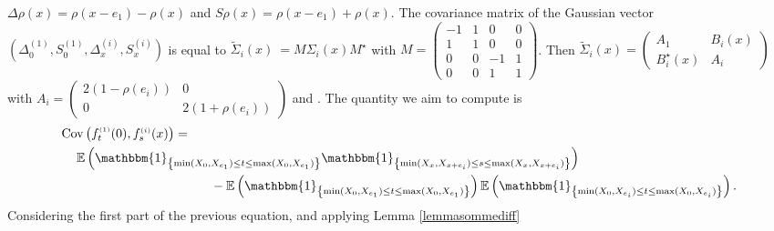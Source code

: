 \documentclass[12pt]{article}
\renewcommand{\tilde}{\widetilde}
\theoremstyle{Theorem}
\begin{document}
$\Delta \rho(x) = \rho(x-e_1)-\rho(x)$ and $S\rho(x)  =  \rho(x-e_1)+\rho(x)$. The covariance matrix of the Gaussian vector $\left(\Delta^{\scriptscriptstyle (1)}_{\scriptscriptstyle 0}, S^{\scriptscriptstyle (1)}_{\scriptscriptstyle 0}, \Delta^{\scriptscriptstyle (i)}_{\scriptscriptstyle x}, S^{\scriptscriptstyle (i)}_{\scriptscriptstyle x}\right)$ is equal to ${\tilde{\Sigma}_{i}(x)~= M\Sigma_{i}(x) M^{\star}}$ with {\small $M = \begin{pmatrix}
-1 & 1 & 0 &  0 \\
1 & 1 & 0 &  0 \\
0& 0 & -1 &  1 \\
0 & 0 & 1 & 1
\end{pmatrix}$}. Then $\tilde{\Sigma}_{i}(x) = \begin{pmatrix} A_{1} & B_{i}(x) \\ B^{\star}_{i}(x) & A_{i} \end{pmatrix}$
with 
$A_{i} = \begin{pmatrix} 2(1-\rho(e_i)) & 0 \\ 0 & 2(1+\rho(e_i))\end{pmatrix}$ and . The quantity we aim to compute is 
{\small
\begin{align}
\label{covconf}
\text{Cov}\left(f_{t}^{\scriptscriptstyle (1)}(0), f_{s}^{ \scriptscriptstyle (i)}(x)\right) & = \nonumber \\
& \hspace{-2.7cm} \mathbb{E}\left(\mathbbm{1}_{\left\{\min(X_{\scriptscriptstyle 0}, X_{e_1}) \leq t \leq \max(X_{\scriptscriptstyle 0}, X_{e_1})\right\}}\mathbbm{1}_{\left\{\min(X_{\scriptscriptstyle x}, X_{x+e_i}) \leq s \leq \max(X_{\scriptscriptstyle x}, X_{x+e_i}) \right\}}\right) \nonumber\\
& \hspace{1cm} - \mathbb{E}\left(\mathbbm{1}_{\left\{\min(X_{\scriptscriptstyle 0}, X_{e_1}) \leq t \leq \max(X_{\scriptscriptstyle 0}, X_{e_1})\right\}}\right)\mathbb{E}\left(\mathbbm{1}_{\left\{\min(X_{\scriptscriptstyle 0}, X_{e_i}) \leq t \leq \max(X_{\scriptscriptstyle 0}, X_{e_i})\right\}}\right).
\end{align}}Considering the first part of the previous equation, and applying Lemma \ref{lemmasommediff}
\end{document}
